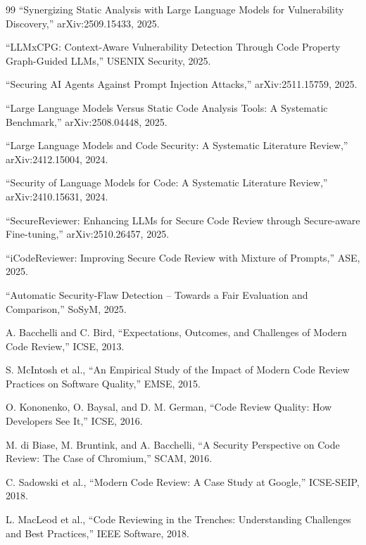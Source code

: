 \documentclass[11pt,a4paper,onecolumn]{article}
\begin{document}
\begin{thebibliography}{99}
``Synergizing Static Analysis with Large Language Models for Vulnerability Discovery,'' arXiv:2509.15433, 2025.

``LLMxCPG: Context-Aware Vulnerability Detection Through Code Property Graph-Guided LLMs,'' USENIX Security, 2025.

``Securing AI Agents Against Prompt Injection Attacks,'' arXiv:2511.15759, 2025.

``Large Language Models Versus Static Code Analysis Tools: A Systematic Benchmark,'' arXiv:2508.04448, 2025.

``Large Language Models and Code Security: A Systematic Literature Review,'' arXiv:2412.15004, 2024.

``Security of Language Models for Code: A Systematic Literature Review,'' arXiv:2410.15631, 2024.

``SecureReviewer: Enhancing LLMs for Secure Code Review through Secure-aware Fine-tuning,'' arXiv:2510.26457, 2025.

``iCodeReviewer: Improving Secure Code Review with Mixture of Prompts,'' ASE, 2025.

``Automatic Security-Flaw Detection -- Towards a Fair Evaluation and Comparison,'' SoSyM, 2025.


A. Bacchelli and C. Bird, ``Expectations, Outcomes, and Challenges of Modern Code Review,'' ICSE, 2013.

S. McIntosh et al., ``An Empirical Study of the Impact of Modern Code Review Practices on Software Quality,'' EMSE, 2015.

O. Kononenko, O. Baysal, and D. M. German, ``Code Review Quality: How Developers See It,'' ICSE, 2016.

M. di Biase, M. Bruntink, and A. Bacchelli, ``A Security Perspective on Code Review: The Case of Chromium,'' SCAM, 2016.

C. Sadowski et al., ``Modern Code Review: A Case Study at Google,'' ICSE-SEIP, 2018.

L. MacLeod et al., ``Code Reviewing in the Trenches: Understanding Challenges and Best Practices,'' IEEE Software, 2018.


\end{thebibliography}
\end{document}
